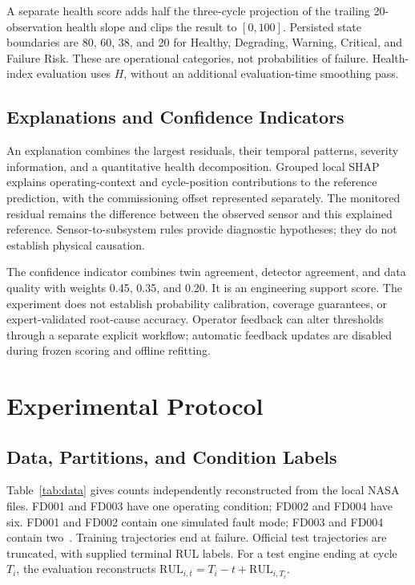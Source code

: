 \documentclass[conference]{IEEEtran}
\begin{document}
A separate health score adds half the three-cycle projection of the trailing 20-observation health slope and clips the result to $[0,100]$. Persisted state boundaries are 80, 60, 38, and 20 for Healthy, Degrading, Warning, Critical, and Failure Risk. These are operational categories, not probabilities of failure. Health-index evaluation uses $H$, without an additional evaluation-time smoothing pass.

\subsection{Explanations and Confidence Indicators}
An explanation combines the largest residuals, their temporal patterns, severity information, and a quantitative health decomposition. Grouped local SHAP explains operating-context and cycle-position contributions to the reference prediction, with the commissioning offset represented separately. The monitored residual remains the difference between the observed sensor and this explained reference. Sensor-to-subsystem rules provide diagnostic hypotheses; they do not establish physical causation.

The confidence indicator combines twin agreement, detector agreement, and data quality with weights 0.45, 0.35, and 0.20. It is an engineering support score. The experiment does not establish probability calibration, coverage guarantees, or expert-validated root-cause accuracy. Operator feedback can alter thresholds through a separate explicit workflow; automatic feedback updates are disabled during frozen scoring and offline refitting.

\section{Experimental Protocol}
\subsection{Data, Partitions, and Condition Labels}
Table~\ref{tab:data} gives counts independently reconstructed from the local NASA files. FD001 and FD003 have one operating condition; FD002 and FD004 have six. FD001 and FD002 contain one simulated fault mode; FD003 and FD004 contain two~\cite{nasaData}. Training trajectories end at failure. Official test trajectories are truncated, with supplied terminal RUL labels. For a test engine ending at cycle $T_i$, the evaluation reconstructs $\mathrm{RUL}_{i,t}=T_i-t+\mathrm{RUL}_{i,T_i}$.
\end{document}
